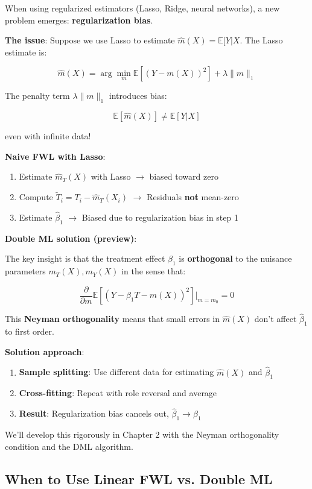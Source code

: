 When using regularized estimators (Lasso, Ridge, neural networks), a new
problem emerges: \textbf{regularization bias}.

\textbf{The issue}: Suppose we use Lasso to estimate
\(\hat{m}(X) = \mathbb{E}[Y|X\). The Lasso estimate is:

\[\hat{m}(X) = \arg\min_m \mathbb{E}[(Y - m(X))^2] + \lambda \|m\|_1\]

The penalty term \(\lambda \|m\|_1\) introduces bias:

\[\mathbb{E}[\hat{m}(X)] \neq \mathbb{E}[Y|X]\]

even with infinite data!

\textbf{Naive FWL with Lasso}:
\begin{enumerate}
\item Estimate $\hat{m}_T(X)$ with Lasso $\to$ biased toward zero
\item Compute $\tilde{T}_i = T_i - \hat{m}_T(X_i)$ $\to$ Residuals \textbf{not} mean-zero
\item Estimate $\hat{\beta}_1$ $\to$ Biased due to regularization bias in step 1
\end{enumerate}

\textbf{Double ML solution (preview)}:

The key insight \cite{chernozhukov2018double} is that the treatment
effect \(\beta_1\) is \textbf{orthogonal} to the nuisance parameters
\(m_T(X), m_Y(X)\) in the sense that:

\[\frac{\partial}{\partial m} \mathbb{E}[(Y - \beta_1 T - m(X))^2] \bigg|_{m = m_0} = 0\]

This \textbf{Neyman orthogonality} means that small errors in
\(\hat{m}(X)\) don't affect \(\hat{\beta}_1\) to first order.

\textbf{Solution approach}:
\begin{enumerate}
\item \textbf{Sample splitting}: Use different data for estimating $\hat{m}(X)$ and $\hat{\beta}_1$
\item \textbf{Cross-fitting}: Repeat with role reversal and average
\item \textbf{Result}: Regularization bias cancels out, $\hat{\beta}_1 \to \beta_1$
\end{enumerate}

We'll develop this rigorously in Chapter 2 with the Neyman orthogonality
condition and the DML algorithm.

\subsection{When to Use Linear FWL vs. Double
ML}\label{_when_to_use_linear_fwl_vs_double_ml}

